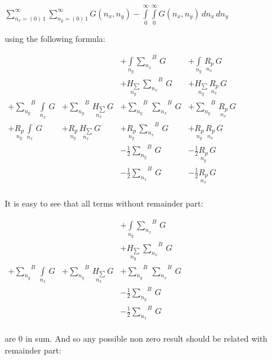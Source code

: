 \documentclass[twoside, 10pt]{article}
\begin{document}
\begin{multicols}{2}
\(\sum\limits_{n_x=\left(0\right)\,1}^{\infty} \sum\limits_{n_y=\left(0\right)\,1}^{\infty} G\left(n_x, n_y\right) - \int\limits_{0}^{\infty} \int\limits_{0}^{\infty} G\left(n_x, n_y\right)\,d{n_x}\,d{n_y}\)

using the following formula:

\noindent
    \(\begin{array}{llll}  \,&  \,&  + \int\limits_{n_y}^{}{\sum\limits_{n_x}^{}}^{B}\,G &  + \int\limits_{n_y}^{}\,\underset{n_x}{R_{p}}\,G \\  \,&  \,&  + \underset{n_y}{H_{\sum}}\,{\sum\limits_{n_x}^{}}^{B}\,G &  + \underset{n_y}{H_{\sum}}\,\underset{n_x}{R_{p}}\,G \\  + {\sum\limits_{n_y}^{}}^{B}\,\int\limits_{n_x}^{}\,G &  + {\sum\limits_{n_y}^{}}^{B}\,\underset{n_x}{H_{\sum}}\,G &  + {\sum\limits_{n_y}^{}}^{B}\,{\sum\limits_{n_x}^{}}^{B}\,G &  + {\sum\limits_{n_y}^{}}^{B}\,\underset{n_x}{R_{p}}\,G \\  + \underset{n_y}{R_{p}}\,\int\limits_{n_x}^{}\,G &  + \underset{n_y}{R_{p}}\,\underset{n_x}{H_{\sum}}\,G &  + \underset{n_y}{R_{p}}\,{\sum\limits_{n_x}^{}}^{B}\,G &  + \underset{n_y}{R_{p}}\,\underset{n_x}{R_{p}}\,G \\  \,&  \,&  - \frac{1}{2}{\sum\limits_{n_y}^{}}^{B}\,G &  - \frac{1}{2}\underset{n_y}{R_{p}}\,G \\  \,&  \,&  - \frac{1}{2}{\sum\limits_{n_x}^{}}^{B}\,G &  - \frac{1}{2}\underset{n_x}{R_{p}}\,G \\ \end{array}\)

    It is easy to see that all terms without remainder part:

    \(\begin{array}{llll}  \,&  \,&  + \int\limits_{n_y}^{}{\sum\limits_{n_x}^{}}^{B}\,G \\  \,&  \,&  + \underset{n_y}{H_{\sum}}\,{\sum\limits_{n_x}^{}}^{B}\,G \\  + {\sum\limits_{n_y}^{}}^{B}\,\int\limits_{n_x}^{}\,G &  + {\sum\limits_{n_y}^{}}^{B}\,\underset{n_x}{H_{\sum}}\,G &  + {\sum\limits_{n_y}^{}}^{B}\,{\sum\limits_{n_x}^{}}^{B}\,G\\  \,&  \,&  - \frac{1}{2}{\sum\limits_{n_y}^{}}^{B}\,G \\  \,&  \,&  - \frac{1}{2}{\sum\limits_{n_x}^{}}^{B}\,G \\ \end{array}\)

    are 0 in sum. And so any possible non zero result should be related with
remainder part:


\end{multicols}
\end{document}
